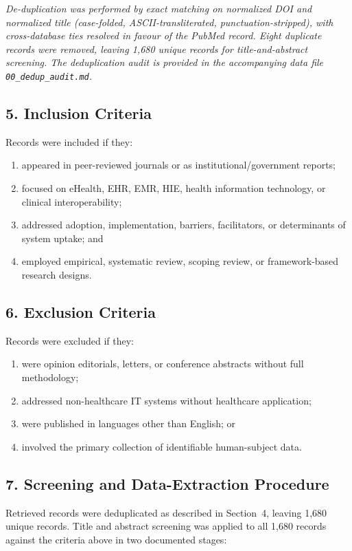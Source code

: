 \noindent\textit{De-duplication was performed by exact matching on normalized DOI
and normalized title (case-folded, ASCII-transliterated, punctuation-stripped),
with cross-database ties resolved in favour of the PubMed record. Eight duplicate
records were removed, leaving 1{,}680 unique records for title-and-abstract
screening. The deduplication audit is provided in the accompanying data file
\texttt{00\_dedup\_audit.md}.}

\subsection*{5. Inclusion Criteria}

Records were included if they:
\begin{enumerate}
\item appeared in peer-reviewed journals or as institutional/government reports;
\item focused on eHealth, EHR, EMR, HIE, health information technology, or clinical
  interoperability;
\item addressed adoption, implementation, barriers, facilitators, or determinants of
  system uptake; and
\item employed empirical, systematic review, scoping review, or framework-based
  research designs.
\end{enumerate}

\subsection*{6. Exclusion Criteria}

Records were excluded if they:
\begin{enumerate}
\item were opinion editorials, letters, or conference abstracts without full
  methodology;
\item addressed non-healthcare IT systems without healthcare application;
\item were published in languages other than English; or
\item involved the primary collection of identifiable human-subject data.
\end{enumerate}

\subsection*{7. Screening and Data-Extraction Procedure}

Retrieved records were deduplicated as described in Section~4, leaving 1{,}680
unique records. Title and abstract screening was applied to all 1{,}680 records
against the criteria above in two documented stages:

